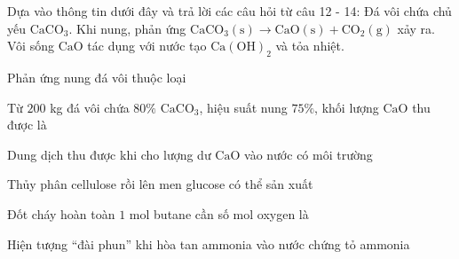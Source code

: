 \begin{baidoc}
\item[] Dựa vào thông tin dưới đây và trả lời các câu hỏi từ câu 12 - 14:
Đá vôi chứa chủ yếu $\mathrm{CaCO_3}$. Khi nung, phản ứng
$\mathrm{CaCO_3(s)\rightarrow CaO(s)+CO_2(g)}$ xảy ra. Vôi sống $\mathrm{CaO}$ tác dụng với nước tạo $\mathrm{Ca(OH)_2}$ và tỏa nhiệt.

\begin{ex}
Phản ứng nung đá vôi thuộc loại
\end{ex}

\begin{ex}
Từ $200$ kg đá vôi chứa $80\%$ $\mathrm{CaCO_3}$, hiệu suất nung $75\%$, khối lượng $\mathrm{CaO}$ thu được là
\end{ex}

\begin{ex}
Dung dịch thu được khi cho lượng dư $\mathrm{CaO}$ vào nước có môi trường
\end{ex}
\end{baidoc}

\begin{ex}
Thủy phân cellulose rồi lên men glucose có thể sản xuất
\end{ex}

\begin{ex}
Đốt cháy hoàn toàn $1$ mol butane cần số mol oxygen là
\end{ex}

\begin{ex}
Hiện tượng “đài phun” khi hòa tan ammonia vào nước chứng tỏ ammonia
\end{ex}


